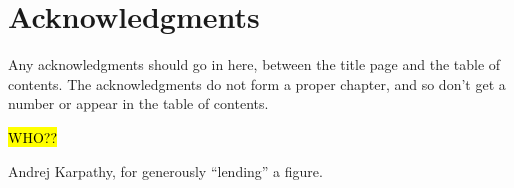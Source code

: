 \chapter*{Acknowledgments}\label{C:ack} 
Any acknowledgments should go 
in here, between the title page and the table of contents.  The 
acknowledgments do not form a proper chapter, and so don't get a 
number or appear in the table of contents.


\hl{WHO??}

Andrej Karpathy, for generously ``lending'' a figure.
